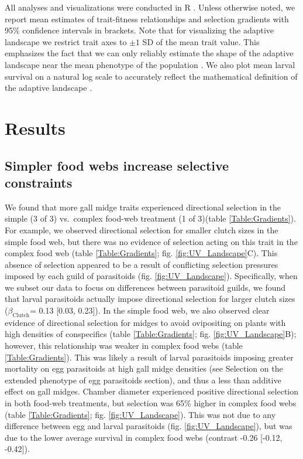 \documentclass[11pt,]{article}
\begin{document}
All analyses and visualizations were conducted in R \citep{R2018}.
Unless otherwise noted, we report mean estimates of trait-fitness
relationships and selection gradients with 95\% confidence intervals in
brackets. Note that for visualizing the adaptive landscape we restrict
trait axes to \(\pm 1\) SD of the mean trait value. This emphasizes the
fact that we can only reliably estimate the shape of the adaptive
landscape near the mean phenotype of the population \citep{Arnold2001}.
We also plot mean larval survival on a natural log scale to accurately
reflect the mathematical definition of the adaptive landscape
\citep{Arnold2003}.

\section{Results}\label{results}

\subsection{Simpler food webs increase selective
constraints}\label{simpler-food-webs-increase-selective-constraints}

\indent We found that more gall midge traits experienced directional
selection in the simple (3 of 3) vs.~complex food-web treatment (1 of
3)(table \ref{Table:Gradients}). For example, we observed directional
selection for smaller clutch sizes in the simple food web, but there was
no evidence of selection acting on this trait in the complex food web
(table \ref{Table:Gradients}; fig. \ref{fig:UV_Landscape}C). This
absence of selection appeared to be a result of conflicting selection
pressures imposed by each guild of parasitoids (fig.
\ref{fig:UV_Landscape}). Specifically, when we subset our data to focus
on differences between parasitoid guilds, we found that larval
parasitoids actually impose directional selection for larger clutch
sizes (\(\beta_{\text{Clutch}}\)= 0.13 {[}0.03, 0.23{]}). In the simple
food web, we also observed clear evidence of directional selection for
midges to avoid ovipositing on plants with high densities of
conspecifics (table \ref{Table:Gradients}; fig.
\ref{fig:UV_Landscape}B); however, this relationship was weaker in
complex food webs (table \ref{Table:Gradients}). This was likely a
result of larval parasitoids imposing greater mortality on egg
parasitoids at high gall midge densities (see Selection on the extended
phenotype of egg parasitoids section), and thus a less than additive
effect on gall midges. Chamber diameter experienced positive directional
selection in both food-web treatments, but selection was 65\% higher in
complex food webs (table \ref{Table:Gradients}; fig.
\ref{fig:UV_Landscape}). This was not due to any difference between egg
and larval parasitoids (fig. \ref{fig:UV_Landscape}), but was due to the
lower average survival in complex food webs (contrast -0.26 {[}-0.12,
-0.42{]}).
\end{document}
